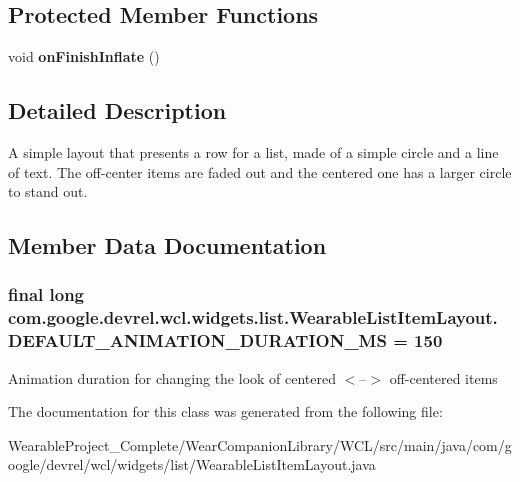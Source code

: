 \subsection*{Protected Member Functions}
\begin{DoxyCompactItemize}
\item 
void {\bfseries on\+Finish\+Inflate} ()\hypertarget{classcom_1_1google_1_1devrel_1_1wcl_1_1widgets_1_1list_1_1WearableListItemLayout_a3e656c5c1eaaab57a7e2ecbd3861cce2}{}\label{classcom_1_1google_1_1devrel_1_1wcl_1_1widgets_1_1list_1_1WearableListItemLayout_a3e656c5c1eaaab57a7e2ecbd3861cce2}

\end{DoxyCompactItemize}


\subsection{Detailed Description}
A simple layout that presents a row for a list, made of a simple circle and a line of text. The off-\/center items are faded out and the centered one has a larger circle to stand out. 

\subsection{Member Data Documentation}
\subsubsection[{\texorpdfstring{D\+E\+F\+A\+U\+L\+T\+\_\+\+A\+N\+I\+M\+A\+T\+I\+O\+N\+\_\+\+D\+U\+R\+A\+T\+I\+O\+N\+\_\+\+MS}{DEFAULT_ANIMATION_DURATION_MS}}]{\setlength{\rightskip}{0pt plus 5cm}final long com.\+google.\+devrel.\+wcl.\+widgets.\+list.\+Wearable\+List\+Item\+Layout.\+D\+E\+F\+A\+U\+L\+T\+\_\+\+A\+N\+I\+M\+A\+T\+I\+O\+N\+\_\+\+D\+U\+R\+A\+T\+I\+O\+N\+\_\+\+MS = 150\hspace{0.3cm}{\ttfamily [static]}}\hypertarget{classcom_1_1google_1_1devrel_1_1wcl_1_1widgets_1_1list_1_1WearableListItemLayout_a845225e253377b50a78a65b087d52a13}{}\label{classcom_1_1google_1_1devrel_1_1wcl_1_1widgets_1_1list_1_1WearableListItemLayout_a845225e253377b50a78a65b087d52a13}
Animation duration for changing the look of centered $<$--$>$ off-\/centered items 

The documentation for this class was generated from the following file\+:\begin{DoxyCompactItemize}
\item 
Wearable\+Project\+\_\+\+Complete/\+Wear\+Companion\+Library/\+W\+C\+L/src/main/java/com/google/devrel/wcl/widgets/list/Wearable\+List\+Item\+Layout.\+java\end{DoxyCompactItemize}
